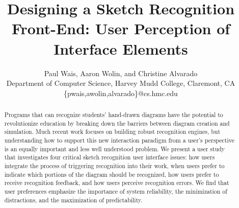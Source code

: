 \documentclass{egpubl}
\title[Designing a Sketch Recognition Front-End]
      {Designing a Sketch Recognition Front-End: User Perception of
Interface Elements}
\author[P. Wais, A. Wolin, and C. Alvarado]
       {Paul Wais, Aaron Wolin, and Christine Alvarado
        \\
         Department of Computer Science, Harvey Mudd College,
         Claremont, CA\\
	 \{pwais,awolin,alvarado\}@cs.hmc.edu\\
       }
\begin{document}
\maketitle

\begin{abstract}
   Programs that can recognize students' hand-drawn diagrams have the
   potential to revolutionize education by breaking down the barriers
   between diagram creation and simulation.  Much recent work focuses
   on building robust recognition engines, but understanding how to
   support this new interaction paradigm from a user's perspective is
   an equally important and less well understood problem.  We
   present a user study that investigates four critical sketch
   recognition user interface issues: how users integrate the process
   of triggering recognition into their work, when users prefer to
   indicate which portions of the diagram should be recognized, how
   users prefer to receive recognition feedback, and how users
   perceive recognition errors.  We find that user preferences
   emphasize the importance of system reliability, the minimization of
   distractions, and the maximization of predictability. 
   





 




\end{abstract}
\end{document}
